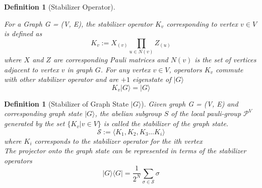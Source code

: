 \documentclass{article}
\newtheorem{definition}[theorem]{Definition}
\newcommand{\ket}[1]{|#1\rangle}
\newcommand{\bra}[1]{\langle #1|}
\begin{document}

\begin{definition} [Stabilizer Operator] \label{def:stabilzer_operator}
    
For a Graph G = (V, E), the stabilizer operator $ K_v $ corresponding to vertex $ v \in V $ is defined as 
\begin{equation}
\label{eq:stabilzer_operator}
    K_v := X_{(v)} \prod_{u \in N(v)} Z_{(u)}
\end{equation}
where $X$ and $Z$ are corresponding Pauli matrices and $N(v)$ is the set of vertices adjacent to vertex $v$ in graph $G$. 
For any vertex $v \in V$, operators $K_v$ commute with other stabilizer operator and are $+1$ eigenstate of $\ket{G}$
\begin{equation}
\label{eq:graph_state_eigenvector_of_stabilzer_operator}
    K_v \ket{G} = \ket{G}
\end{equation}
\end{definition}
\begin{definition} [Stabilizer of Graph State $\ket{G}$] \label{def:stabilizer_of_graph_state}
Given graph G = (V, E) and corresponding graph state $\ket{G}$, the abelian subgroup $S$ of the local pauli-group $\mathcal{P}^{V}$ generated by the set $\{K_v| v \in V\}$ is called the stabilizer of the graph state.
\begin{equation}
\label{eq:stabilizer_of_graph_state}
    \mathcal{S} := \langle K_1, K_2, K_3 \dots K_i \rangle
\end{equation}
where $K_i$ corresponds to the stabilizer operator for the ith vertex
\\
The projector onto the graph state can be represented in terms of the stabilizer operators
\begin{equation}
\label{eq:graph_state_in_terms_of_stabilizer_operators}
    \ket{G}\bra{G} = \frac{1}{2^N} \sum_{\sigma \in \mathcal{S}} \sigma
\end{equation}
    
\end{definition}
\end{document}
